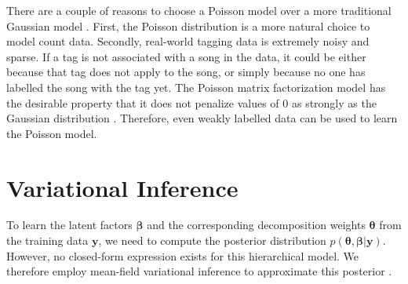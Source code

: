 There are a couple of reasons to choose a Poisson model over a more traditional Gaussian model \citep{salakhutdinov2007probabilistic}. First, the Poisson distribution is a more natural choice to model count data. Secondly, real-world tagging data is extremely noisy and sparse. If a tag is not associated with a song in the data, it could be either because that tag does not apply to the song, or simply because no one has labelled the song with the tag yet. The Poisson matrix factorization model has the desirable property that it does not penalize values of $0$ as strongly as the Gaussian distribution \citep{paisley2015handbook,Gopalan:2015}. Therefore, even weakly labelled data can be used to learn the Poisson model.  

\section{Variational Inference}\label{sec:inference}

To learn the latent factors $\boldsymbol{\beta}$ and the corresponding decomposition weights $\boldsymbol{\theta}$ from the training data $\boldsymbol{y}$, we need to compute the posterior distribution $p(\boldsymbol{\theta}, \boldsymbol{\beta} | \boldsymbol{y})$. However, no closed-form expression exists for this hierarchical model. We therefore employ mean-field variational inference to approximate this posterior \cite{jordan1999introduction}.

